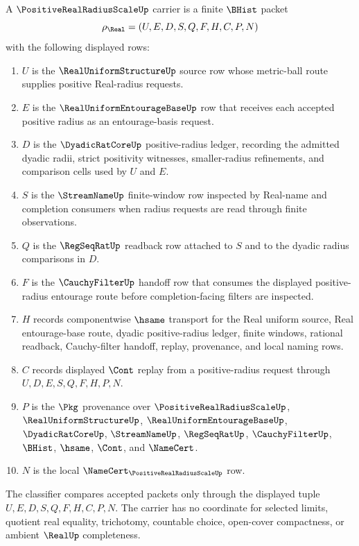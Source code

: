 \begin{definition}
\label{def:positive-real-radius-scale-carrier}
A $\PositiveRealRadiusScaleUp$ carrier is a finite $\BHist$ packet
$$
\rho_{\Real}=(U,E,D,S,Q,F,H,C,P,N)
$$
with the following displayed rows:
\begin{enumerate}
\item $U$ is the $\RealUniformStructureUp$ source row whose metric-ball route supplies positive Real-radius requests.
\item $E$ is the $\RealUniformEntourageBaseUp$ row that receives each accepted positive radius as an entourage-basis request.
\item $D$ is the $\DyadicRatCoreUp$ positive-radius ledger, recording the admitted dyadic radii, strict positivity witnesses, smaller-radius refinements, and comparison cells used by $U$ and $E$.
\item $S$ is the $\StreamNameUp$ finite-window row inspected by Real-name and completion consumers when radius requests are read through finite observations.
\item $Q$ is the $\RegSeqRatUp$ readback row attached to $S$ and to the dyadic radius comparisons in $D$.
\item $F$ is the $\CauchyFilterUp$ handoff row that consumes the displayed positive-radius entourage route before completion-facing filters are inspected.
\item $H$ records componentwise $\hsame$ transport for the Real uniform source, Real entourage-base route, dyadic positive-radius ledger, finite windows, rational readback, Cauchy-filter handoff, replay, provenance, and local naming rows.
\item $C$ records displayed $\Cont$ replay from a positive-radius request through $U,D,E,S,Q,F,H,P,N$.
\item $P$ is the $\Pkg$ provenance over $\PositiveRealRadiusScaleUp$, $\RealUniformStructureUp$, $\RealUniformEntourageBaseUp$, $\DyadicRatCoreUp$, $\StreamNameUp$, $\RegSeqRatUp$, $\CauchyFilterUp$, $\BHist$, $\hsame$, $\Cont$, and $\NameCert$.
\item $N$ is the local $\NameCert_{\PositiveRealRadiusScaleUp}$ row.
\end{enumerate}
The classifier compares accepted packets only through the displayed tuple $U,E,D,S,Q,F,H,C,P,N$. The carrier has no coordinate for selected limits, quotient real equality, trichotomy, countable choice, open-cover compactness, or ambient $\RealUp$ completeness.
\end{definition}

